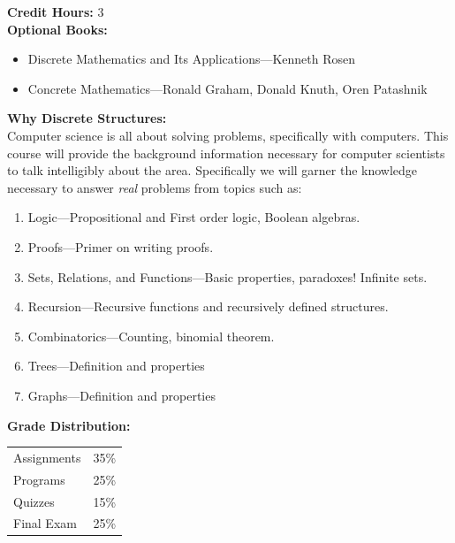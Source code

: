 \documentclass[11pt]{article}
\begin{document}
\textbf {Credit Hours:} 3 \\

\textbf{\large Optional Books:}
\begin{itemize}
  \item Discrete Mathematics and Its Applications---Kenneth Rosen

  \item Concrete Mathematics---Ronald Graham, Donald Knuth, Oren Patashnik
\end{itemize}

\textbf {\large Why Discrete Structures:} \\
Computer science is all about solving problems, specifically with computers. This course will provide the background information necessary for computer scientists to talk intelligibly about the area.
Specifically we will garner the knowledge necessary to answer \emph{real} problems from topics such as:
\begin{enumerate} \itemsep-0.4em
  \item Logic---Propositional and First order logic, Boolean algebras.
  \item Proofs---Primer on writing proofs.
  \item Sets, Relations, and Functions---Basic properties, paradoxes! Infinite sets.
  \item Recursion---Recursive functions and recursively defined structures.
  \item Combinatorics---Counting, binomial theorem.
  \item Trees---Definition and properties 
  \item Graphs---Definition and properties
\end{enumerate}

\textbf {\large Grade Distribution:} \\
\hspace*{40mm}
\begin{tabular}{ l l }
Assignments & 35\% \\
Programs & 25\% \\
Quizzes  & 15\% \\
Final Exam  & 25\%
\end{tabular} \\\\
\end{document}
